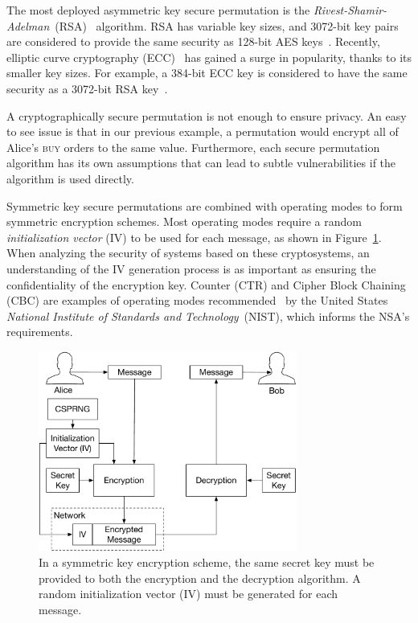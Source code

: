 The most deployed asymmetric key secure permutation is the
\textit{Rivest-Shamir-Adelman}~(RSA)~\cite{rivest1978rsa} algorithm. RSA has
variable key sizes, and 3072-bit key pairs are considered to provide the same
security as 128-bit AES keys~\cite{fips2012keysize}. Recently, elliptic curve
cryptography (ECC)~\cite{koblitz1987ecc} has gained a surge in popularity,
thanks to its smaller key sizes. For example, a 384-bit ECC key is considered
to have the same security as a 3072-bit RSA
key~\cite{fips2012keysize, nsa2015suiteb}.

A cryptographically secure permutation is not enough to ensure privacy. An easy
to see issue is that in our previous example, a permutation would encrypt all
of Alice's \textsc{buy} orders to the same value. Furthermore, each secure
permutation algorithm has its own assumptions that can lead to subtle
vulnerabilities if the algorithm is used directly.

Symmetric key secure permutations are combined with operating modes to form
symmetric encryption schemes. Most operating modes require a random
\textit{initialization vector} (IV) to be used for each message, as shown in
Figure~\ref{fig:symmetric_encryption}. When analyzing the security of systems
based on these cryptosystems, an understanding of the IV generation process is
as important as ensuring the confidentiality of the encryption key. Counter
(CTR) and Cipher Block Chaining (CBC) are examples of operating modes
recommended~\cite{fips2001ctr} by the United States \textit{National Institute
of Standards and Technology}~(NIST), which informs the NSA's requirements.

\begin{figure}[hbt]
  \centering
  \includegraphics[width=85mm]{figures/symmetric_encryption.pdf}
  \caption{
    In a symmetric key encryption scheme, the same secret key must be provided
    to both the encryption and the decryption algorithm. A random
    initialization vector (IV) must be generated for each message.
  }
  \label{fig:symmetric_encryption}
\end{figure}




